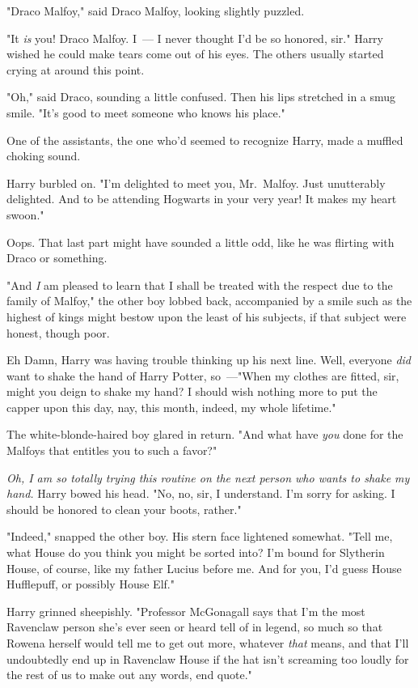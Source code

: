 "Draco Malfoy," said Draco Malfoy, looking slightly puzzled.

"It \emph{is} you! Draco Malfoy. I~--- I never thought I'd be so honored, sir."
Harry wished he could make tears come out of his eyes. The others usually
started crying at around this point.

"Oh," said Draco, sounding a little confused. Then his lips stretched in a smug
smile. "It's good to meet someone who knows his place."

One of the assistants, the one who'd seemed to recognize Harry, made a muffled
choking sound.

Harry burbled on. "I'm delighted to meet you, Mr.~Malfoy. Just unutterably
delighted. And to be attending Hogwarts in your very year! It makes my heart
swoon."

Oops. That last part might have sounded a little odd, like he was flirting with
Draco or something.

"And \emph{I} am pleased to learn that I shall be treated with the respect due
to the family of Malfoy," the other boy lobbed back, accompanied by a smile
such as the highest of kings might bestow upon the least of his subjects, if
that subject were honest, though poor.

Eh{\el} Damn, Harry was having trouble thinking up his next line. Well,
everyone \emph{did} want to shake the hand of Harry Potter, so~---"When my
clothes are fitted, sir, might you deign to shake my hand? I should wish
nothing more to put the capper upon this day, nay, this month, indeed, my whole
lifetime."

The white-blonde-haired boy glared in return. "And what have \emph{you} done
for the Malfoys that entitles you to such a favor?"

\emph{Oh, I am so totally trying this routine on the next person who wants to
shake my hand.} Harry bowed his head. "No, no, sir, I understand. I'm sorry for
asking. I should be honored to clean your boots, rather."

"Indeed," snapped the other boy. His stern face lightened somewhat. "Tell me,
what House do you think you might be sorted into? I'm bound for Slytherin
House, of course, like my father Lucius before me. And for you, I'd guess House
Hufflepuff, or possibly House Elf."

Harry grinned sheepishly. "Professor McGonagall says that I'm the most
Ravenclaw person she's ever seen or heard tell of in legend, so much so that
Rowena herself would tell me to get out more, whatever \emph{that} means, and
that I'll undoubtedly end up in Ravenclaw House if the hat isn't screaming too
loudly for the rest of us to make out any words, end quote."

